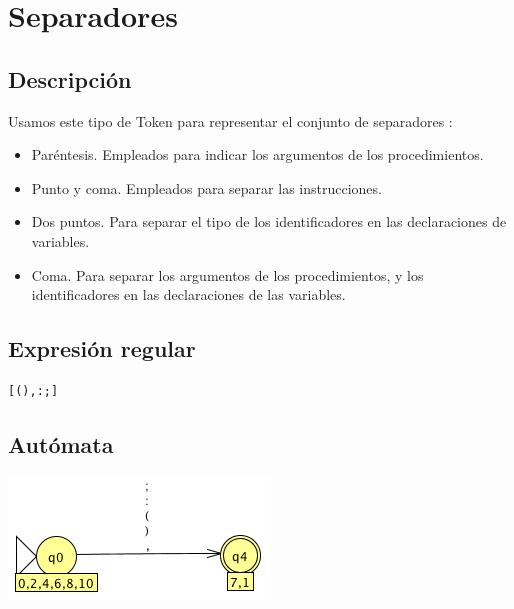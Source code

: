             \hfill
            \clearpage
            
            
            
    \section{Separadores}
    
        \subsection{Descripción}
        
            Usamos este tipo de Token para representar el conjunto de separadores :
            
            \begin{itemize}
                \item Paréntesis. Empleados para indicar los argumentos de los procedimientos.
                \item Punto y coma. Empleados para separar las instrucciones.
                \item Dos puntos. Para separar el tipo de los identificadores en las declaraciones de variables.
                \item Coma. Para separar los argumentos de los procedimientos, y los identificadores en las declaraciones de las variables.
            \end{itemize}
            
        \subsection{Expresión regular}
            
             \begin{lstlisting}[language=Perl]
[(),:;]
             \end{lstlisting}


        \subsection{Autómata}
            
	        \includegraphics[scale=.7]{../Design/jflap/Separador.png}
	        
